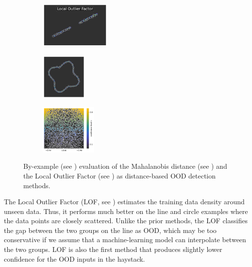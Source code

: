 \begin{figure}[H]
    \begin{subfigure}
        \centering
        \includegraphics[width=0.388\textwidth,valign=t]{ood-detection/figures/ood-detection/confidence-line-lof.pdf}
    \end{subfigure}
    \begin{subfigure}
        \centering
        \includegraphics[width=0.254\textwidth,valign=t]{ood-detection/figures/ood-detection/confidence-circle-lof.pdf}
    \end{subfigure}
    \begin{subfigure}
        \centering
        \includegraphics[width=0.308\textwidth,valign=t]{ood-detection/figures/ood-detection/confidence-haystack-lof.pdf}
    \end{subfigure}

    \caption[Distance-based OOD detection methods]{By-example (see ) evaluation of the Mahalanobis distance (see ) and the Local Outlier Factor (see ) as distance-based OOD detection methods.}
    \label{fig:md-lof-ood-detection}
\end{figure}

\noindent The Local Outlier Factor (LOF, see ) estimates the training data density around unseen data. Thus, it performs much better on the line and circle examples where the data points are closely scattered. Unlike the prior methods, the LOF classifies the gap between the two groups on the line as OOD, which may be too conservative if we assume that a machine-learning model can interpolate between the two groups. LOF is also the first method that produces slightly lower confidence for the OOD inputs in the haystack.

